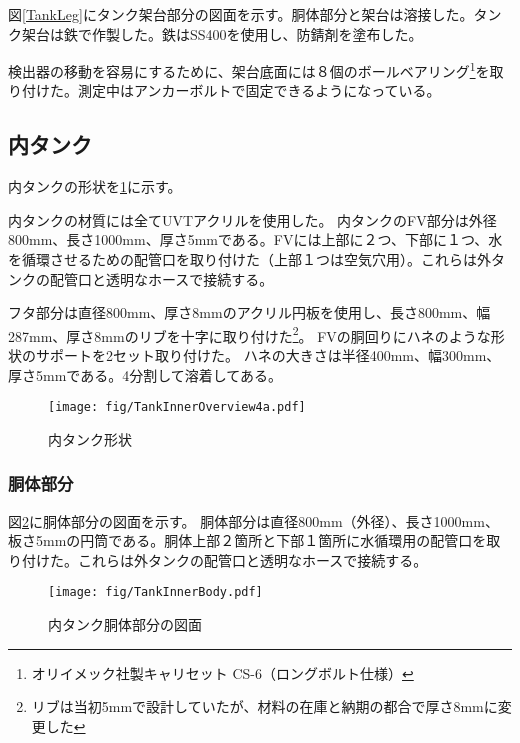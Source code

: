\documentclass[11pt]{ltjsreport}
\newcommand{\figref}[1]{図\ref{#1}}
\begin{document}
\figref{TankLeg}にタンク架台部分の図面を示す。胴体部分と架台は溶接した。タンク架台は鉄で作製した。鉄はSS400を使用し、防錆剤を塗布した。

検出器の移動を容易にするために、架台底面には８個のボールベアリング\footnote{オリイメック社製キャリセット CS-6（ロングボルト仕様）}を取り付けた。測定中はアンカーボルトで固定できるようになっている。


\newpage
\subsection{内タンク}
内タンクの形状を\ref{InnerTankOverview}に示す。

内タンクの材質には全てUVTアクリルを使用した。
内タンクのFV部分は外径800mm、長さ1000mm、厚さ5mmである。FVには上部に２つ、下部に１つ、水を循環させるための配管口を取り付けた（上部１つは空気穴用）。これらは外タンクの配管口と透明なホースで接続する。

フタ部分は直径800mm、厚さ8mmのアクリル円板を使用し、長さ800mm、幅287mm、厚さ8mmのリブを十字に取り付けた\footnote{リブは当初5mmで設計していたが、材料の在庫と納期の都合で厚さ8mmに変更した}。
FVの胴回りにハネのような形状のサポートを2セット取り付けた。
ハネの大きさは半径400mm、幅300mm、厚さ5mmである。4分割して溶着してある。

\begin{figure}[htbp]
\centering
\texttt{[image: fig/TankInnerOverview4a.pdf]}
\caption[内タンク形状]{内タンク形状}
\label{InnerTankOverview}
\end{figure}
\newpage
\subsubsection{胴体部分}

\figref{TankInnerBody}に胴体部分の図面を示す。
胴体部分は直径800mm（外径）、長さ1000mm、板さ5mmの円筒である。胴体上部２箇所と下部１箇所に水循環用の配管口を取り付けた。これらは外タンクの配管口と透明なホースで接続する。


\begin{figure}[htbp]
\centering
\texttt{[image: fig/TankInnerBody.pdf]}
\caption[内タンク胴体部分の図面]{内タンク胴体部分の図面}
\label{TankInnerBody}
\end{figure}
\end{document}
